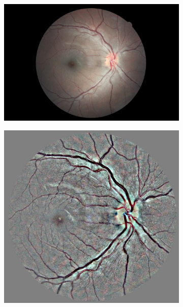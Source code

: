 \begin{figure}[tb]
\begin{subfigure}[b]{0.24\textwidth}
    \end{subfigure}
    \hfill
    \begin{subfigure}[b]{0.24\textwidth}
         \centering
         \includegraphics[width=\textwidth, height=\textwidth]{figures/chapter4/Preprocessing/Ori/114_right.jpeg}
    \end{subfigure}
    \hfill
    \begin{subfigure}[b]{0.24\textwidth}
         \centering
         \includegraphics[width=\textwidth, height=\textwidth]{figures/chapter4/Preprocessing/Prep/114_right.jpeg}
     \end{subfigure}


\end{figure}
